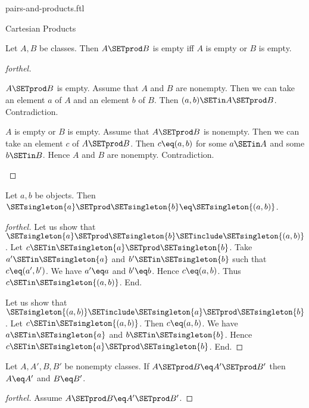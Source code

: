 \documentclass{naproche-library}
\begin{document}
\begin{smodule}[title=Ordered Pairs and Cartesian Products]{pairs-and-products.ftl}
\begin{sfragment}{Cartesian Products}
  \begin{proposition}[forthel,id=FOUNDATIONS_04_2198552029691904]
    Let $A, B$ be classes.
    Then $A \SETprod B$ is empty iff $A$ is empty or $B$ is empty.
  \end{proposition}
  \begin{proof}[forthel]
    \begin{case}{$A \SETprod B$ is empty.}
      Assume that $A$ and $B$ are nonempty.
      Then we can take an element $a$ of $A$ and an element $b$ of $B$.
      Then $(a, b) \SETin A \SETprod B$.
      Contradiction.
    \end{case}

    \begin{case}{$A$ is empty or $B$ is empty.}
      Assume that $A \SETprod B$ is nonempty.
      Then we can take an element $c$ of $A \SETprod B$.
      Then $c \eq (a, b)$ for some $a \SETin A$ and some $b \SETin B$.
      Hence $A$ and $B$ are nonempty.
      Contradiction.
    \end{case}
  \end{proof}

  \begin{proposition}[forthel,id=FOUNDATIONS_04_7971087096741888]
    Let $a, b$ be objects.
    Then $\SETsingleton{a} \SETprod \SETsingleton{b} \eq \SETsingleton{(a, b)}$.
  \end{proposition}
  \begin{proof}[forthel]
    Let us show that $\SETsingleton{a} \SETprod \SETsingleton{b} \SETinclude \SETsingleton{(a, b)}$.
      Let $c \SETin \SETsingleton{a} \SETprod \SETsingleton{b}$.
      Take $a' \SETin \SETsingleton{a}$ and $b' \SETin \SETsingleton{b}$ such that $c \eq (a', b')$.
      We have $a' \eq a$ and $b' \eq b$.
      Hence $c \eq (a, b)$.
      Thus $c \SETin \SETsingleton{(a, b)}$.
    End.

    Let us show that $\SETsingleton{(a, b)} \SETinclude \SETsingleton{a} \SETprod \SETsingleton{b}$.
      Let $c \SETin \SETsingleton{(a, b)}$.
      Then $c \eq (a, b)$.
      We have $a \SETin \SETsingleton{a}$ and $b \SETin \SETsingleton{b}$.
      Hence $c \SETin \SETsingleton{a} \SETprod \SETsingleton{b}$.
    End.
  \end{proof}

  \begin{proposition}[forthel,id=FOUNDATIONS_04_7456594440749056]
    Let $A, A', B, B'$ be nonempty classes.
    If $A \SETprod B \eq A' \SETprod B'$ then $A \eq A'$ and $B \eq B'$.
  \end{proposition}
  \begin{proof}[forthel]
    Assume $A \SETprod B \eq A' \SETprod B'$.


\end{proof}
\end{sfragment}
\end{smodule}
\end{document}
